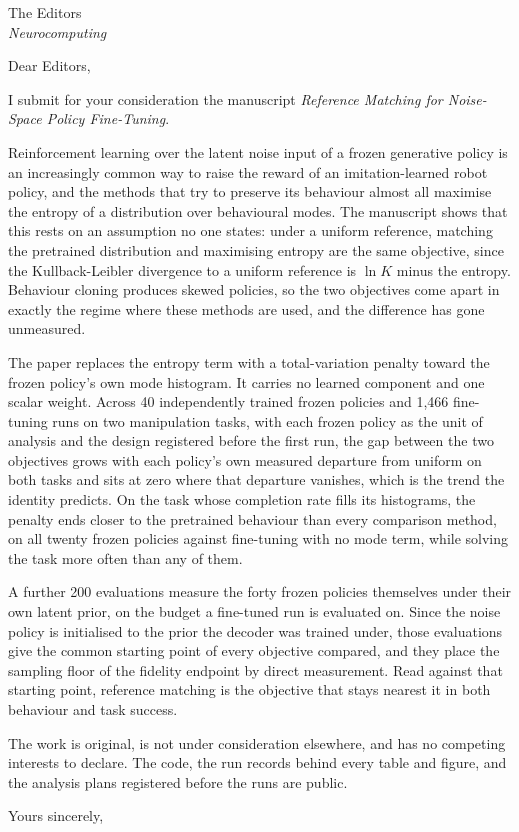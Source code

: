 \documentclass[11pt,a4paper]{letter}
\begin{document}
\begin{letter}{The Editors\\\textit{Neurocomputing}}
\opening{Dear Editors,}

I submit for your consideration the manuscript \textit{Reference Matching for
Noise-Space Policy Fine-Tuning}.

Reinforcement learning over the latent noise input of a frozen generative policy
is an increasingly common way to raise the reward of an imitation-learned robot
policy, and the methods that try to preserve its behaviour almost all maximise
the entropy of a distribution over behavioural modes. The manuscript shows that
this rests on an assumption no one states: under a uniform reference, matching
the pretrained distribution and maximising entropy are the same objective, since
the Kullback-Leibler divergence to a uniform reference is $\ln K$ minus the
entropy. Behaviour cloning produces skewed policies, so the two objectives come
apart in exactly the regime where these methods are used, and the difference has
gone unmeasured.

The paper replaces the entropy term with a total-variation penalty toward the
frozen policy's own mode histogram. It carries no learned component and one
scalar weight. Across 40 independently trained frozen policies and 1{,}466
fine-tuning runs on two manipulation tasks, with each frozen policy as the unit
of analysis and the design registered before the first run, the gap between the
two objectives grows with each policy's own measured departure from uniform on
both tasks and sits at zero where that departure vanishes, which is the trend
the identity predicts. On the task whose completion rate fills its histograms,
the penalty ends closer to the pretrained behaviour than every comparison
method, on all twenty frozen policies against fine-tuning with no mode term,
while solving the task more often than any of them.

A further 200 evaluations measure the forty frozen policies themselves under
their own latent prior, on the budget a fine-tuned run is evaluated on. Since
the noise policy is initialised to the prior the decoder was trained under,
those evaluations give the common starting point of every objective compared,
and they place the sampling floor of the fidelity endpoint by direct
measurement. Read against that starting point, reference matching
is the objective that stays nearest it in both behaviour and task success.

The work is original, is not under consideration elsewhere, and has no competing
interests to declare. The code, the run records behind every table and figure,
and the analysis plans registered before the runs are public.

\closing{Yours sincerely,}
\end{letter}
\end{document}
